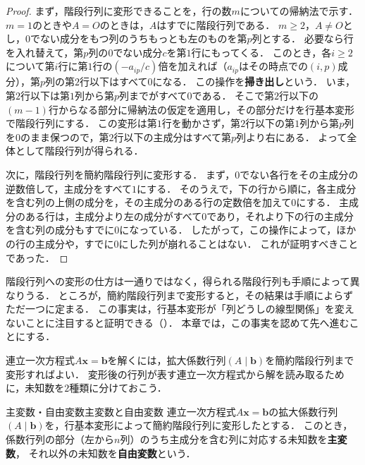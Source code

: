 \begin{tleftbar}
\begin{proof}
  まず，階段行列に変形できることを，行の数$m$についての帰納法で示す．
  $m = 1$のときや$A = O$のときは，$A$はすでに階段行列である．
  $m \ge 2$，$A \ne O$とし，$0$でない成分をもつ列のうちもっとも左のものを第$p$列とする．
  必要なら行を入れ替えて，第$p$列の$0$でない成分$c$を第$1$行にもってくる．
  このとき，各$i \ge 2$について第$i$行に第$1$行の$(-a_{ip}/c)$倍を加えれば（$a_{ip}$はその時点での$(i, p)$成分），第$p$列の第$2$行以下はすべて$0$になる．
  この操作を\textbf{掃き出し}という．
  いま，第$2$行以下は第$1$列から第$p$列までがすべて$0$である．
  そこで第$2$行以下の$(m - 1)$行からなる部分に帰納法の仮定を適用し，その部分だけを行基本変形で階段行列にする．
  この変形は第$1$行を動かさず，第$2$行以下の第$1$列から第$p$列を$0$のまま保つので，第$2$行以下の主成分はすべて第$p$列より右にある．
  よって全体として階段行列が得られる．

  次に，階段行列を簡約階段行列に変形する．
  まず，$0$でない各行をその主成分の逆数倍して，主成分をすべて$1$にする．
  そのうえで，下の行から順に，各主成分を含む列の上側の成分を，その主成分のある行の定数倍を加えて$0$にする．
  主成分のある行は，主成分より左の成分がすべて$0$であり，それより下の行の主成分を含む列の成分もすでに$0$になっている．
  したがって，この操作によって，ほかの行の主成分や，すでに$0$にした列が崩れることはない．
  これが証明すべきことであった．
\end{proof}
\end{tleftbar}

\begin{remark}[簡約階段行列の一意性]
  階段行列への変形の仕方は一通りではなく，得られる階段行列も手順によって異なりうる．
  ところが，簡約階段行列まで変形すると，その結果は手順によらずただ一つに定まる．
  この事実は，行基本変形が「列どうしの線型関係」を変えないことに注目すると証明できる（）．
  本章では，この事実を認めて先へ進むことにする．
\end{remark}

連立一次方程式$A\bm{x} = \bm{b}$を解くには，拡大係数行列$(A \mid \bm{b})$を簡約階段行列まで変形すればよい．
変形後の行列が表す連立一次方程式から解を読み取るために，未知数を$2$種類に分けておこう．

\begin{definition}{主変数・自由変数}{主変数と自由変数}
  連立一次方程式$A\bm{x} = \bm{b}$の拡大係数行列$(A \mid \bm{b})$を，行基本変形によって簡約階段行列に変形したとする．
  このとき，係数行列の部分（左から$n$列）のうち主成分を含む列に対応する未知数を\textbf{主変数}，
  それ以外の未知数を\textbf{自由変数}という．
\end{definition}

